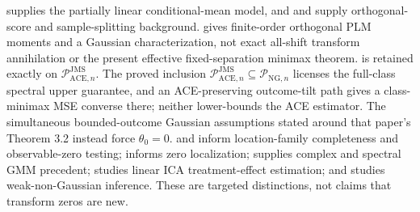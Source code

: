 \cite{Robinson1988} supplies the partially linear conditional-mean model, and \cite{ChernozhukovEtAl2018DML} and \cite{NeweyRobins2018} supply orthogonal-score and sample-splitting background.  \cite{MackeySyrgkanisZadik2018} gives finite-order orthogonal PLM moments and a Gaussian characterization, not exact all-shift transform annihilation or the present effective fixed-separation minimax theorem.  \cite[Theorem 5.4, condition (21), and bound (22)]{JinMackeySyrgkanis2025} is retained exactly on \(\mathcal P_{\mathrm{ACE},n}^{\mathrm{JMS}}\).  The proved inclusion \(\mathcal P_{\mathrm{ACE},n}^{\mathrm{JMS}}\subseteq\mathcal P_{\mathrm{NG},n}\) licenses the full-class spectral upper guarantee, and an ACE-preserving outcome-tilt path gives a class-minimax MSE converse there; neither lower-bounds the ACE estimator.  The simultaneous bounded-outcome Gaussian assumptions stated around that paper's Theorem 3.2 instead force \(\theta_0=0\).  \cite{Mattner1992} and \cite{HuShiu2022} inform location-family completeness and observable-zero testing; \cite{DinhGhoshTranTran2021} informs zero localization; \cite{ChackoViceira2003} supplies complex and spectral GMM precedent; \cite{ReizingerEtAl2025} studies linear ICA treatment-effect estimation; and \cite{LeeMesters2024} studies weak-non-Gaussian inference.  These are targeted distinctions, not claims that transform zeros are new.